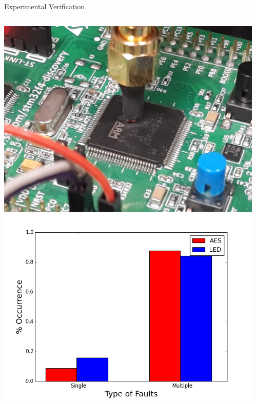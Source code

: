 \documentclass[table,aspectratio=169]{beamer}
\begin{document}
\begin{frame}{Experimental Verification}
\vspace{-0.5cm}
\begin{columns}[onlytextwidth]
\begin{center}
\includegraphics[width=0.5\linewidth]{./figures/fault_probe_on_chip.jpeg}
\includegraphics[width=0.65\linewidth]{./figures/faults_multiple.png}
\end{center}
\begin{center}
\end{center}
\end{columns}
\end{frame}
\end{document}
